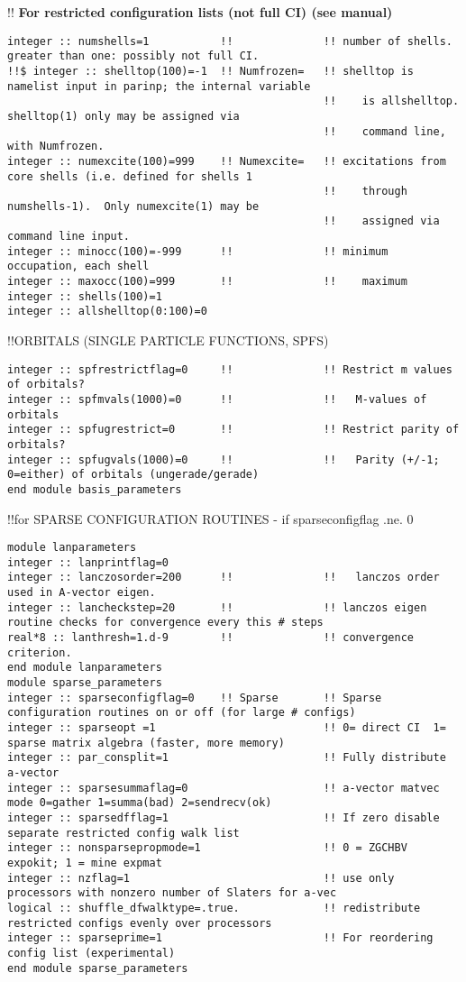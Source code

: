 !! \textbf{\qquad For restricted configuration lists (not full CI) (see manual)}
\begin{verbatim}
integer :: numshells=1           !!              !! number of shells.  greater than one: possibly not full CI. 
!!$ integer :: shelltop(100)=-1  !! Numfrozen=   !! shelltop is namelist input in parinp; the internal variable 
                                                 !!    is allshelltop.   shelltop(1) only may be assigned via 
                                                 !!    command line, with Numfrozen.
integer :: numexcite(100)=999    !! Numexcite=   !! excitations from core shells (i.e. defined for shells 1 
                                                 !!    through numshells-1).  Only numexcite(1) may be 
                                                 !!    assigned via command line input.
integer :: minocc(100)=-999      !!              !! minimum occupation, each shell
integer :: maxocc(100)=999       !!              !!    maximum
integer :: shells(100)=1
integer :: allshelltop(0:100)=0           
\end{verbatim}
!!{\large \quad ORBITALS (SINGLE PARTICLE FUNCTIONS, SPFS)}
\begin{verbatim}
integer :: spfrestrictflag=0     !!              !! Restrict m values of orbitals?  
integer :: spfmvals(1000)=0      !!              !!   M-values of orbitals 
integer :: spfugrestrict=0       !!              !! Restrict parity of orbitals? 
integer :: spfugvals(1000)=0     !!              !!   Parity (+/-1; 0=either) of orbitals (ungerade/gerade)
end module basis_parameters
\end{verbatim}
!!{\large \quad for SPARSE CONFIGURATION ROUTINES - if sparseconfigflag .ne. 0}
\begin{verbatim}
module lanparameters
integer :: lanprintflag=0
integer :: lanczosorder=200      !!              !!   lanczos order used in A-vector eigen.
integer :: lancheckstep=20       !!              !! lanczos eigen routine checks for convergence every this # steps
real*8 :: lanthresh=1.d-9        !!              !! convergence criterion.
end module lanparameters
module sparse_parameters
integer :: sparseconfigflag=0    !! Sparse       !! Sparse configuration routines on or off (for large # configs)
integer :: sparseopt =1                          !! 0= direct CI  1= sparse matrix algebra (faster, more memory)
integer :: par_consplit=1                        !! Fully distribute a-vector
integer :: sparsesummaflag=0                     !! a-vector matvec mode 0=gather 1=summa(bad) 2=sendrecv(ok)
integer :: sparsedfflag=1                        !! If zero disable separate restricted config walk list
integer :: nonsparsepropmode=1                   !! 0 = ZGCHBV expokit; 1 = mine expmat
integer :: nzflag=1                              !! use only processors with nonzero number of Slaters for a-vec
logical :: shuffle_dfwalktype=.true.             !! redistribute restricted configs evenly over processors
integer :: sparseprime=1                         !! For reordering config list (experimental)
end module sparse_parameters
\end{verbatim}
